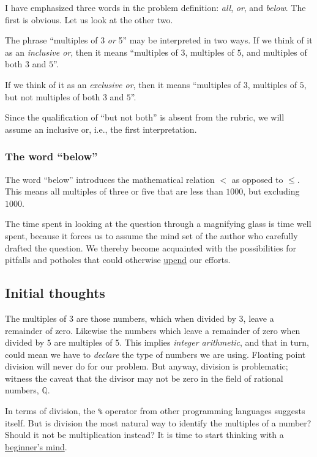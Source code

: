 \documentclass[
  a4paper,
]{article}
\begin{document}
I have emphasized three words in the problem definition: \emph{all},
\emph{or}, and \emph{below}. The first is obvious. Let us look at the
other two.

The phrase ``multiples of 3 \emph{or} 5'' may be interpreted in two
ways. If we think of it as an \emph{inclusive or}, then it means
``multiples of \(3\), multiples of \(5\), and multiples of both \(3\)
and \(5\)''.

If we think of it as an \emph{exclusive or}, then it means ``multiples
of \(3\), multiples of \(5\), but not multiples of both \(3\) and
\(5\)''.

Since the qualification of ``but not both'' is absent from the rubric,
we will assume an inclusive or, i.e., the first interpretation.

\hypertarget{the-word-below}{%
\subsubsection{The word ``below''}\label{the-word-below}}

The word ``below'' introduces the mathematical relation \(<\) as opposed
to \(\leq\). This means all multiples of three or five that are less
than \(1000\), but excluding \(1000\).

The time spent in looking at the question through a magnifying glass is
time well spent, because it forces us to assume the mind set of the
author who carefully drafted the question. We thereby become acquainted
with the possibilities for pitfalls and potholes that could otherwise
\href{https://www.powerthesaurus.org/upend/synonyms}{upend} our efforts.

\hypertarget{initial-thoughts}{%
\subsection{Initial thoughts}\label{initial-thoughts}}

The multiples of \(3\) are those numbers, which when divided by \(3\),
leave a remainder of zero. Likewise the numbers which leave a remainder
of zero when divided by \(5\) are multiples of \(5\). This implies
\emph{integer arithmetic}, and that in turn, could mean we have to
\emph{declare} the type of numbers we are using. Floating point division
will never do for our problem. But anyway, division is problematic;
witness the caveat that the divisor may not be zero in the field of
rational numbers, \(\mathbb{Q}\).

In terms of division, the \texttt{\%} operator from other programming
languages suggests itself. But is division the most natural way to
identify the multiples of a number? Should it not be multiplication
instead? It is time to start thinking with a
\href{https://en.wikipedia.org/wiki/Shoshin}{beginner's mind}.
\end{document}
